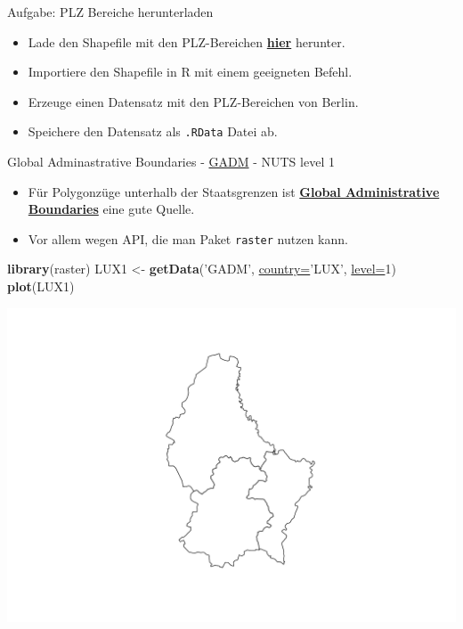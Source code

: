 \documentclass[ignorenonframetext,]{beamer}
\newenvironment{Shaded}{\begin{snugshade}}{\end{snugshade}}
\newcommand{\KeywordTok}[1]{\textcolor[rgb]{0.26,0.66,0.93}{\textbf{#1}}}
\newcommand{\DataTypeTok}[1]{\textcolor[rgb]{0.74,0.68,0.62}{\underline{#1}}}
\newcommand{\DecValTok}[1]{\textcolor[rgb]{0.27,0.67,0.26}{#1}}
\newcommand{\StringTok}[1]{\textcolor[rgb]{0.02,0.61,0.04}{#1}}
\newcommand{\NormalTok}[1]{\textcolor[rgb]{0.74,0.68,0.62}{#1}}
\providecommand{\tightlist}{%
  \setlength{\itemsep}{0pt}\setlength{\parskip}{0pt}}
\begin{document}
\begin{frame}[fragile]{Aufgabe: PLZ Bereiche herunterladen}

\begin{itemize}
\tightlist
\item
  Lade den Shapefile mit den PLZ-Bereichen
  \href{http://arnulf.us/PLZ}{\textbf{hier}} herunter.
\item
  Importiere den Shapefile in R mit einem geeigneten Befehl.
\item
  Erzeuge einen Datensatz mit den PLZ-Bereichen von Berlin.
\item
  Speichere den Datensatz als \texttt{.RData} Datei ab.
\end{itemize}

\end{frame}

\begin{frame}[fragile]{Global Adminastrative Boundaries -
\href{http://www.gadm.org/}{GADM} - NUTS level 1}

\begin{itemize}
\tightlist
\item
  Für Polygonzüge unterhalb der Staatsgrenzen ist
  \href{http://www.gadm.org/}{\textbf{Global Administrative Boundaries}}
  eine gute Quelle.
\item
  Vor allem wegen API, die man Paket \texttt{raster} nutzen kann.
\end{itemize}

\begin{Shaded}
\begin{Highlighting}[]
\KeywordTok{library}\NormalTok{(raster)}
\NormalTok{LUX1 <-}\StringTok{ }\KeywordTok{getData}\NormalTok{(}\StringTok{'GADM'}\NormalTok{, }\DataTypeTok{country=}\StringTok{'LUX'}\NormalTok{, }\DataTypeTok{level=}\DecValTok{1}\NormalTok{)}
\KeywordTok{plot}\NormalTok{(LUX1)}
\end{Highlighting}
\end{Shaded}

\includegraphics{Geomedizin_files/figure-beamer/unnamed-chunk-103-1.pdf}

\end{frame}
\end{document}
